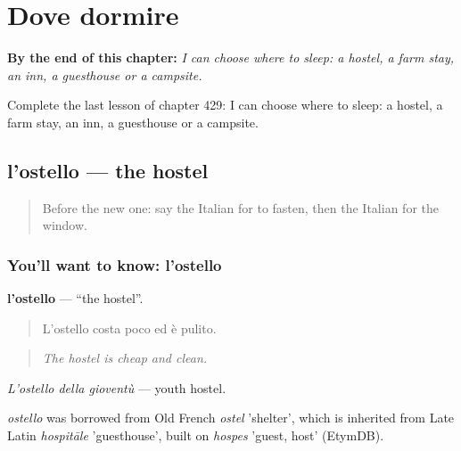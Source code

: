 
\chapter{Dove dormire}
\label{ch:it-dove-dormire}

\begin{chapteropening}
\textbf{By the end of this chapter:} \emph{I can choose where to sleep: a hostel, a farm stay, an inn, a guesthouse or a campsite.}

Complete the last lesson of chapter 429: I can choose where to sleep: a hostel, a farm stay, an inn, a guesthouse or a campsite.
\end{chapteropening}

\section[l'ostello]{l'ostello — the hostel}

\label{lesson:IT-C429-ostello}



\begin{quote}
Before the new one: say the Italian for to fasten, then the Italian for the window.
\end{quote}

\subsection*{You'll want to know: l'ostello}
\textbf{l'ostello} — \textquotedblleft{}the hostel\textquotedblright{}.

\begin{quote}
L'ostello costa poco ed è pulito.
\end{quote}

\begin{quote}
\emph{The hostel is cheap and clean.}
\end{quote}

\emph{L'ostello della gioventù} — youth hostel.

\begin{cousinweb}
\emph{ostello} was borrowed from Old French \emph{ostel} 'shelter', which is inherited from Late Latin \emph{hospitāle} 'guesthouse', built on \emph{hospes} 'guest, host' (EtymDB).
\end{cousinweb}

